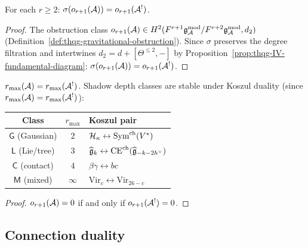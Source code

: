 \begin{corollary}
\label{cor:thqg-IV-obstruction-duality}
For each $r \geq 2$:
$\sigma(o_{r+1}(\mathcal{A})) = o_{r+1}(\mathcal{A}^!)$.
\end{corollary}

\begin{proof}
The obstruction class $o_{r+1}(\mathcal{A})
\in H^2(F^{r+1}\mathfrak{g}_{\mathcal{A}}^{\mathrm{mod}}/F^{r+2}\mathfrak{g}_{\mathcal{A}}^{\mathrm{mod}}, d_2)$
(Definition~\ref{def:thqg-gravitational-obstruction}).
Since $\sigma$ preserves the degree filtration and intertwines
$d_2 = d + [\Theta^{\leq 2}, -]$ by Proposition~\ref{prop:thqg-IV-fundamental-diagram}:
$\sigma(o_{r+1}(\mathcal{A})) = o_{r+1}(\mathcal{A}^!)$.
\end{proof}

\begin{corollary}
\label{cor:thqg-IV-shadow-depth}
$r_{\max}(\mathcal{A}) = r_{\max}(\mathcal{A}^!)$.
Shadow depth classes are stable under Koszul duality (since $r_{\max}(\mathcal{A}) = r_{\max}(\mathcal{A}^!)$):
\begin{center}
\renewcommand{\arraystretch}{1.2}
\begin{tabular}{ccl}
\textbf{Class} & $r_{\max}$ & \textbf{Koszul pair} \\
\hline
$\mathsf{G}$ (Gaussian) & $2$ &
$\mathcal{H}_\kappa \leftrightarrow \operatorname{Sym}^{\mathrm{ch}}(V^*)$ \\
$\mathsf{L}$ (Lie/tree) & $3$ &
$\widehat{\mathfrak{g}}_k \leftrightarrow \mathrm{CE}^{\mathrm{ch}}(\widehat{\mathfrak{g}}_{-k-2h^\vee})$ \\
$\mathsf{C}$ (contact) & $4$ &
$\beta\gamma \leftrightarrow bc$ \\
$\mathsf{M}$ (mixed) & $\infty$ &
$\mathrm{Vir}_c \leftrightarrow \mathrm{Vir}_{26-c}$ \\
\end{tabular}
\end{center}
\end{corollary}

\begin{proof}
$o_{r+1}(\mathcal{A}) = 0$ if and only if $o_{r+1}(\mathcal{A}^!) = 0$.
\end{proof}

%
%

\subsection{Connection duality}
\label{subsec:thqg-IV-connection-duality}

